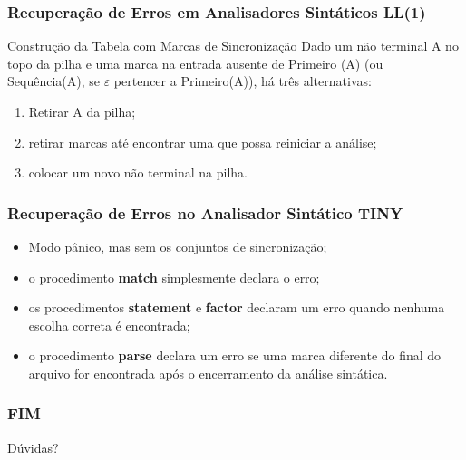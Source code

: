 \documentclass[table]{beamer}
\begin{document}
\begin{frame}
   \frametitle{Recuperação de Erros em Analisadores Sintáticos LL(1)}
   \begin{block}{Construção da Tabela com Marcas de Sincronização}
   Dado um não terminal A no topo da pilha e uma marca na entrada ausente de Primeiro (A) (ou Sequência(A), se $\varepsilon$ pertencer a Primeiro(A)), há três alternativas:
      \begin{enumerate}
         \item Retirar A da pilha;
	 \item retirar marcas até encontrar uma que possa reiniciar a análise;
	 \item colocar um novo não terminal na pilha.
      \end{enumerate}
   \end{block}
\end{frame}

\begin{frame}
   \frametitle{Recuperação de Erros no Analisador Sintático TINY}
   \begin{itemize}
      \item Modo pânico, mas sem os conjuntos de sincronização;
      \item o procedimento \textbf{match} simplesmente declara o erro;
      \item os procedimentos \textbf{statement} e \textbf{factor} declaram um erro quando nenhuma escolha correta é encontrada;
      \item o procedimento \textbf{parse} declara um erro se uma marca diferente do final do arquivo for encontrada após o encerramento da análise sintática.
   \end{itemize}
\end{frame}

\begin{frame}
   \frametitle{FIM}
   Dúvidas?
\end{frame}
\end{document}
